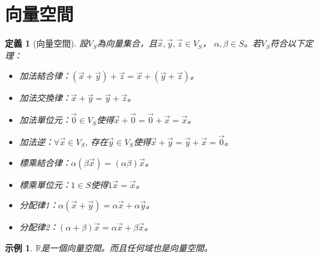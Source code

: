 \documentclass[12pt]{article}
\newtheorem{definition}{定義}
\newtheorem*{example}{示例}
\begin{document}
    \section*{向量空間}

    \begin{definition}[向量空間]
        設$V_S$為向量集合，且$\vec{x},\vec{y},\vec{z}\in V_S$， $\alpha, \beta \in S$。若$V_S$符合以下定理：\begin{itemize}
            \item 加法結合律：$(\vec{x}+\vec{y})+\vec{z}=\vec{x}+(\vec{y}+\vec{z})$。
            \item 加法交換律：$\vec{x}+\vec{y}=\vec{y}+\vec{z}$。
            \item 加法單位元：$\vec{0}\in V_S$使得$\vec{x}+\vec{0}=\vec{0}+\vec{x}=\vec{x}$。
            \item 加法逆：$\forall \vec{x}\in V_S$, 存在$\vec{y}\in V_S$使得$\vec{x}+\vec{y}=\vec{y}+\vec{x}=\vec{0}$。
            \item 標乘結合律：$\alpha(\beta \vec{x})=(\alpha\beta)\vec{x}$。
            \item 標乘單位元：$1\in S$使得$1\vec{x}=\vec{x}$。
            \item 分配律1：$\alpha(\vec{x}+\vec{y})=\alpha\vec{x}+\alpha\vec{y}$。
            \item 分配律2：$(\alpha+\beta)\vec{x}=\alpha\vec{x}+\beta\vec{x}$。
        \end{itemize}
    \end{definition}

    \begin{example}
        $\mathbb{R}$是一個向量空間。而且任何域也是向量空間。
    \end{example}
\end{document}
